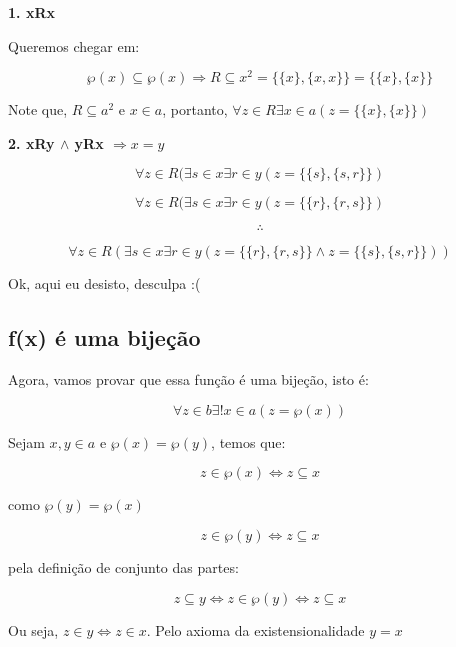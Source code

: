 \documentclass[12pt]{extarticle}
\begin{document}
\textbf{1. xRx}

Queremos chegar em:

$$
\wp (x) \subseteq \wp (x) \Rightarrow R \subseteq x^2 = \{\{x\},\{x,x\}\} = \{\{x\},\{x\}\}
$$



Note que, $R \subseteq a^2$ e $x \in a$, portanto, $\forall z \in R \exists x \in a  (z = \{\{x\},\{x\}\})$

\textbf{2. xRy $\land$ yRx $\Rightarrow x = y$}

$$
\forall z \in R (\exists s \in x \exists r \in y (z = \{\{s\},\{s,r\}\})
$$

$$
\forall z \in R (\exists s \in x \exists r \in y (z = \{\{r\},\{r,s\}\})
$$

$$
\therefore
$$

$$
\forall z \in R (\exists s \in x \exists r \in y(z = \{\{r\},\{r,s\}\} \land z = \{\{s\},\{s,r\}\} ))
$$

Ok, aqui eu desisto, desculpa :(

\subsection{f(x) é uma bijeção}

Agora, vamos provar que essa função é uma bijeção, isto é:

$$
\forall z \in b \exists ! x \in a (z = \wp (x))
$$

Sejam $x,y \in a$ e $\wp (x) = \wp (y)$, temos que:

$$
z \in \wp (x) \Leftrightarrow z \subseteq x 
$$

como $\wp(y) = \wp(x)$

$$
z \in \wp (y) \Leftrightarrow z \subseteq x
$$

pela definição de conjunto das partes:

$$
 z \subseteq y \Leftrightarrow z \in \wp (y) \Leftrightarrow z \subseteq x 
$$

Ou seja, $z \in y \Leftrightarrow z \in x$. Pelo axioma da existensionalidade $y = x$
\end{document}
